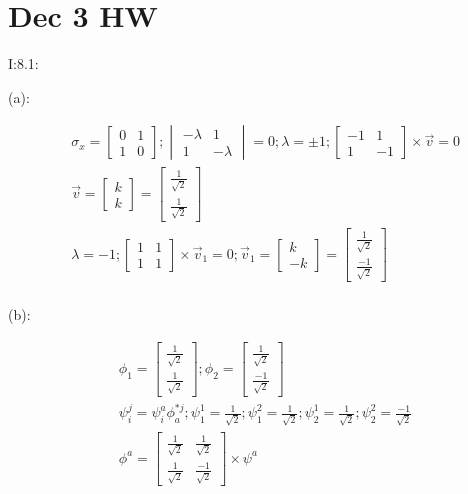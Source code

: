 \documentclass{article}
\begin{document}
\section{Dec 3 HW}

I:8.1:

(a):

\begin{align*}
   &\sigma_x=\begin{bmatrix}0&1\\1&0\end{bmatrix};\begin{vmatrix}-\lambda&1\\1&-\lambda\end{vmatrix}=0;\lambda=\pm1;\begin{bmatrix}-1&1\\1&-1\end{bmatrix}\times\vec v=0\\
   &\vec v=\begin{bmatrix}k\\k\end{bmatrix}=\begin{bmatrix}\frac1{\sqrt{2}}\\\frac1{\sqrt{2}}\end{bmatrix}\\
   &\lambda=-1;\begin{bmatrix}1&1\\1&1\end{bmatrix}\times\vec v_1=0;\vec v_1=\begin{bmatrix}k\\-k\end{bmatrix}=\begin{bmatrix}\frac1{\sqrt{2}}\\\frac{-1}{\sqrt{2}}\end{bmatrix}\\
\end{align*}

(b):

\begin{align*}
  &\phi_1=\begin{bmatrix}\frac1{\sqrt{2}}\\\frac1{\sqrt{2}}\end{bmatrix};\phi_2=\begin{bmatrix}\frac1{\sqrt{2}}\\\frac{-1}{\sqrt{2}}\end{bmatrix}\\
  &\psi_i^j=\psi_i^a\phi^{*j}_a;\psi_1^1=\frac1{\sqrt{2}};\psi_1^2=\frac1{\sqrt{2}};\psi_2^1=\frac1{\sqrt{2}};\psi_2^2=\frac{-1}{\sqrt{2}}\\
  &\phi^a=\begin{bmatrix}\frac1{\sqrt{2}}&\frac1{\sqrt{2}}\\\frac1{\sqrt{2}}&\frac{-1}{\sqrt{2}}\end{bmatrix}\times\psi^a\\
\end{align*}
\end{document}

